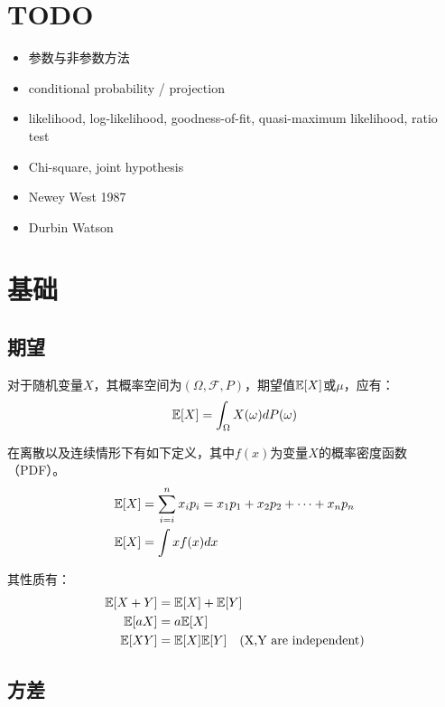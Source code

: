 \documentclass[11pt]{article}
\begin{document}
\maketitle
\tableofcontents

\section{TODO}
\begin{itemize}
    \item 参数与非参数方法
    \item conditional probability / projection
    \item likelihood, log-likelihood, goodness-of-fit, quasi-maximum likelihood, ratio test
    \item Chi-square, joint hypothesis
    \item Newey West 1987
    \item Durbin Watson
\end{itemize}

\section{基础}

\subsection{期望}

对于随机变量$X$，其概率空间为$(\Omega,\mathcal{F},P)$，期望值$\mathbb{E}[X]$或$\mu$，应有：
\begin{equation*}
    \mathbb{E}[X] = \int_{\Omega} X(\omega) dP(\omega)
\end{equation*}

在离散以及连续情形下有如下定义，其中$f(x)$为变量$X$的概率密度函数（PDF）。
\begin{align*}
    \mathbb{E}[X] &= \sum_{i=i}^n x_i p_i =x_1 p_1 + x_2 p_2 + \dots + x_n p_n \\
    \mathbb{E}[X] &= \int x f(x) dx
\end{align*}

其性质有：
\begin{align*}
    \mathbb{E}[X+Y] &= \mathbb{E}[X] + \mathbb{E}[Y] \\
    \mathbb{E}[aX] &= a \mathbb{E}[X] \\
    \mathbb{E}[XY] &= \mathbb{E}[X]\mathbb{E}[Y] \quad \text{(X,Y are independent)}
\end{align*}

\subsection{方差}
\end{document}
